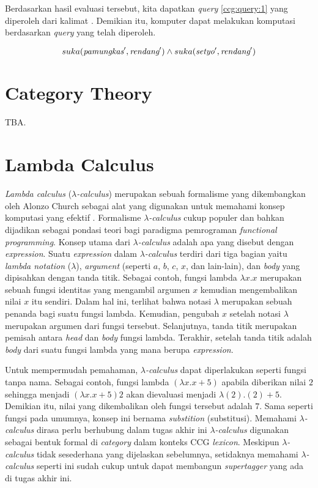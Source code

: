 Berdasarkan hasil evaluasi tersebut, kita dapatkan \textit{query} \ref{ccg:query:1}
yang diperoleh dari kalimat .
Demikian itu, komputer dapat melakukan komputasi berdasarkan \textit{query} yang telah diperoleh.

\begin{equation}\label{ccg:query:1}
  suka(\mbox{\it pamungkas}^\prime, \mbox{\it rendang}^\prime) \land suka(\mbox{\it setyo}^\prime, \mbox{\it rendang}^\prime)
\end{equation}

\section{Category Theory}
TBA.


\section{Lambda Calculus}
\textit{Lambda calculus} ({$\lambda$}\textit{-calculus}) merupakan sebuah formalisme yang dikembangkan
oleh Alonzo Church sebagai alat yang digunakan untuk memahami konsep komputasi yang efektif
\cite{DBLP:journals/corr/Rojas15}.
Formalisme {$\lambda$}\textit{-calculus} cukup populer dan bahkan dijadikan sebagai pondasi teori bagi
paradigma pemrograman \textit{functional programming}.
Konsep utama dari {$\lambda$}\textit{-calculus} adalah apa yang disebut dengan \textit{expression}.
Suatu \textit{expression} dalam {$\lambda$}\textit{-calculus} terdiri dari tiga bagian yaitu
\textit{lambda notation} ({$\lambda$}), \textit{argument} (seperti $a$, $b$, $c$, $x$, dan lain-lain),
dan \textit{body} yang dipisahkan dengan tanda titik.
Sebagai contoh, fungsi lambda ${\lambda}x. x$ merupakan sebuah fungsi identitas yang mengambil
argumen $x$ kemudian mengembalikan nilai $x$ itu sendiri.
Dalam hal ini, terlihat bahwa notasi {$\lambda$} merupakan sebuah penanda bagi suatu fungsi lambda.
Kemudian, pengubah $x$ setelah notasi {$\lambda$} merupakan argumen dari fungsi tersebut.
Selanjutnya, tanda titik merupakan pemisah antara \textit{head} dan \textit{body} fungsi lambda.
Terakhir, setelah tanda titik adalah \textit{body} dari suatu fungsi lambda yang mana berupa
\textit{expression}.

Untuk mempermudah pemahaman, {$\lambda$}\textit{-calculus} dapat diperlakukan seperti fungsi tanpa
nama. Sebagai contoh, fungsi lambda $({\lambda}x. x + 5)$ apabila diberikan nilai $2$ sehingga
menjadi $({\lambda}x. x + 5) 2$ akan dievaluasi menjadi ${\lambda}(2). (2) + 5$.
Demikian itu, nilai yang dikembalikan oleh fungsi tersebut adalah $7$.
Sama seperti fungsi pada umumnya, konsep ini bernama \textit{substition} (substitusi).
Memahami {$\lambda$}\textit{-calculus} dirasa perlu berhubung dalam tugas akhir ini
{$\lambda$}\textit{-calculus} digunakan sebagai bentuk formal di \textit{category}
dalam konteks CCG \textit{lexicon}. Meskipun {$\lambda$}\textit{-calculus} tidak sesederhana
yang dijelaskan sebelumnya, setidaknya memahami {$\lambda$}\textit{-calculus} seperti ini
sudah cukup untuk dapat membangun \textit{supertagger} yang ada di tugas akhir ini.


